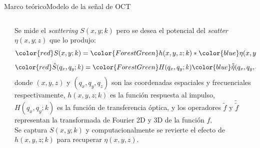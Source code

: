 \documentclass[fleqn,10pt,aspectratio=169,dvipsnames]{beamer}
\begin{document}
\begin{frame}[t]{Marco teórico}{Modelo de la señal de OCT}
\begin{columns}
\begin{column}{.4\textwidth}
\begin{center}
\begin{overprint}
				\end{overprint}
			\end{center}
		\end{column}
		\begin{column}{.6\textwidth}
\small
{ Se mide el {\color{red}\textit{scattering} $S(x, y; k)$} pero se desea el potencial del  {\color{blue}\textit{scatter} $\eta(x, y; z)$} que lo produjo: $${\color{red}S(x, y; k)} = {\color{ForestGreen}h(x, y, z; k)}\ast {\color{blue}\eta(x, y, z)}$$ $${\color{red}\tilde{S}(q_x, q_y; k)} = {\color{ForestGreen}H(q_x, q_y; k)}{\color{blue}\tilde{\tilde{\eta}}(q_x, q_y, q_z)},$$
}
{donde $(x, y, z)$ y $(q_x, q_y, q_z)$ son las coordenadas espaciales y frecuenciales respectivamente, {\color{ForestGreen}$h(x, y, z; k)$} es la función respuesta al impulso, {\color{ForestGreen}$H(q_x, q_y; k)$} es la función de transferencia óptica, y los operadores $\tilde{f}$ y $\tilde{\tilde{f}}$ representan la transformada de Fourier 2D y 3D de la función $f$. \\
}
{\vspace{\baselineskip}
Se captura {\color{red}$S(x, y; k)$} y computacionalmente se revierte el efecto de {\color{ForestGreen}$h(x, y, z; k)$} para recuperar {\color{blue}$\eta(x, y, z)$}.
}
		\end{column}
	\end{columns}
\end{frame}
\end{document}
